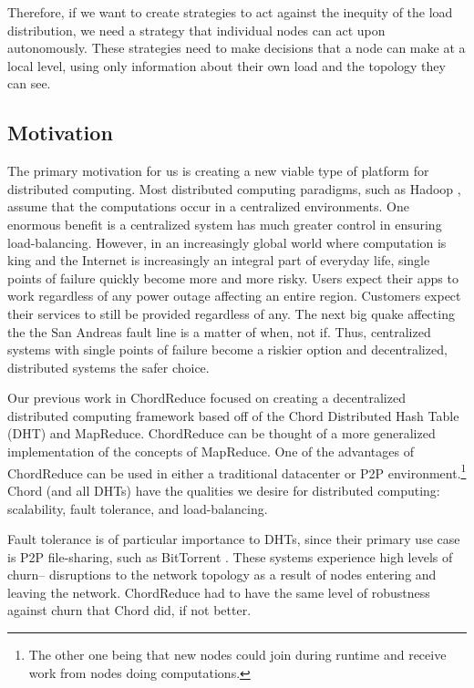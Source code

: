\documentclass[11pt,conference]{IEEEtran}
\begin{document}
Therefore, if we want to create strategies to act against the inequity of the load distribution, we need a strategy that individual nodes can act upon autonomously.
These strategies need to make decisions that a node can make at a local level, using only information about their own load and the topology they can see.


\subsection*{Motivation}
The primary motivation for us is creating a new viable type of platform for distributed computing.
Most distributed computing paradigms, such as Hadoop \cite{hadoop}, assume that the computations occur in a centralized environments.
One enormous benefit is a centralized system has much greater control in ensuring load-balancing.
However, in an increasingly global world where computation is king and the Internet is increasingly an integral part of everyday life, single points of failure quickly become more and more risky.
Users expect their apps to work regardless of any power outage affecting an entire region.
Customers expect their services to still be provided regardless of any.
The next big quake affecting the the San Andreas fault line is a matter of when, not if.
Thus, centralized systems with single points of failure become a riskier option and decentralized, distributed systems the safer choice.


Our previous work in ChordReduce \cite{chordreduce} focused on creating a decentralized distributed computing framework based off of the Chord Distributed Hash Table (DHT) and MapReduce.
ChordReduce can be thought of a more generalized implementation of the concepts of MapReduce.
One of the advantages of ChordReduce can be used in either a traditional datacenter or P2P environment.\footnote{The other one being that new nodes could join during runtime and receive work from nodes doing computations.}
Chord (and all DHTs) have the qualities we desire for distributed computing: scalability, fault tolerance, and load-balancing.

Fault tolerance is of particular importance to DHTs, since their primary use case is P2P file-sharing, such as BitTorrent \cite{bittorrent}.
These systems experience high levels of churn-- disruptions to the network topology as a result of nodes entering and leaving the network.
ChordReduce had to have the same level of robustness against churn that Chord did, if not better.
\end{document}

